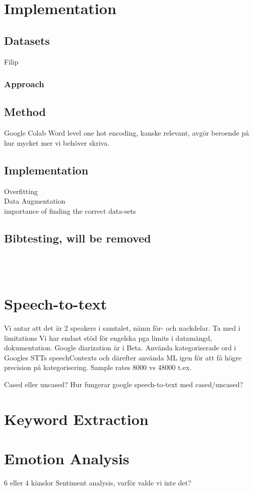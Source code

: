 \documentclass[nofilelist]{cslthse-msc}
\begin{document}
\chapter{Implementation}

\section{Datasets}
Filip
\subsection{Approach} 
\section{Method}
Google Colab
Word level one hot encoding, kanske relevant, avgör beroende på hur mycket mer vi behöver skriva.
\section{Implementation}
Overfitting \\
Data Augmentation \\
importance of finding the correct data-sets \\
\section{Bibtesting, will be removed}
\citep{emotionlinesdataset} \\
\citep{franoischollet2017learning}\\
\citep{beaver2020towards}
\chapter{Speech-to-text}
Vi antar att det är 2 speakers i samtalet, nämn för- och nackdelar. Ta med i limitations
Vi har endast stöd för engelska pga limits i datamängd, dokumentation. 
Google diarization är i Beta.
Använda kategoriserade ord i Googles STTs speechContexts och därefter använda ML igen för att få högre precision på kategorisering. 
Sample rates 8000 vs 48000 t.ex.

Cased eller uncased? Hur fungerar google speech-to-text med cased/uncased?

\chapter{Keyword Extraction}
\chapter{Emotion Analysis}
6 eller 4 känslor
Sentiment analysis, varför valde vi inte det?
\end{document}
